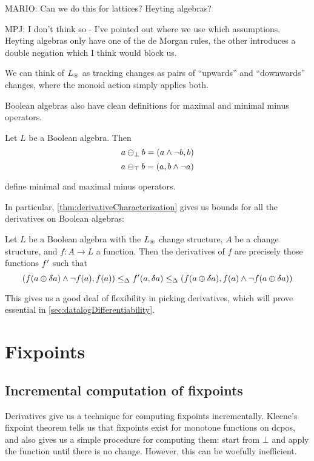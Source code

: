 MARIO: Can we do this for lattices? Heyting algebras?

MPJ: I don't think so - I've pointed out where we use which assumptions. Heyting
algebras only have one of the de Morgan rules, the other introduces a double negation which I
think would block us. 

We can think of $L_\circledast$ as tracking changes as pairs of ``upwards'' and
``downwards'' changes, where the monoid action simply applies both.

Boolean algebras also have clean definitions for maximal and minimal minus
operators.

\begin{prop}
  Let $L$ be a Boolean algebra. Then
  $$a \ominus_\bot b = (a \wedge \neg b, b)$$
  $$a \ominus_\top b = (a, b \wedge \neg a)$$

  define minimal and maximal minus operators.
\end{prop}

In particular, \ref{thm:derivativeCharacterization} gives us bounds for
all the derivatives on Boolean algebras:

\begin{corollary}
\label{cor:booleanCharacterization}
  Let $L$ be a Boolean algebra with the $L_\circledast$ change structure, $A$ be
  a change structure, and $f: A \rightarrow
  L$ a function. Then the derivatives of $f$ are precisely those functions
  $f'$ such that
  $$
  (
    f(a \oplus \delta a) \wedge \neg f(a), 
    f(a)
  )
  \leq_\Delta
  f'(a, \delta a)
  \leq_\Delta
  (
    f(a \oplus \delta a), 
    f(a) \wedge \neg f(a \oplus \delta a)
  )
  $$
\end{corollary}

This gives us a good deal of flexibility in picking derivatives, which will
prove essential in \ref{sec:datalogDifferentiability}.

\section{Fixpoints}

\subsection{Incremental computation of fixpoints}

Derivatives give us a technique for computing fixpoints incrementally. Kleene's
fixpoint theorem tells us that fixpoints exist for monotone functions on dcpos, and also gives us
a simple procedure for computing them: start from $\bot$ and apply the function
until there is no change. However, this can be woefully inefficient.

